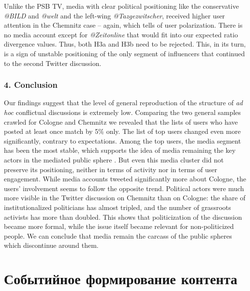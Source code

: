 Unlike the PSB TV, media with clear political positioning like the conservative \textit{@BILD} and \textit{@welt} and the left-wing \textit{@Tazgezwitscher}, received higher user attention in the Chemnitz case -- again, which tells of user polarization. There is no media account except for \textit{@Zeitonline} that would fit into our expected ratio divergence values. Thus, both H3a and H3b need to be rejected. This, in its turn, is a sign of unstable positioning of the only segment of influencers that continued to the second Twitter discussion.

\subsubsection{4. Conclusion}

Our findings suggest that the level of general reproduction of the structure of \textit{ad hoc} conflictual discussions is extremely low. Comparing the two general samples crawled for Cologne and Chemnitz we revealed that the lists of users who have posted at least once match by 5\% only. The list of top users changed even more significantly, contrary to expectations. Among the top users, the media segment has been the most stable, which supports the idea of media remaining the key actors in the mediated public sphere \cite{Calhoun}. But even this media cluster did not preserve its positioning, neither in terms of activity nor in terms of user engagement. While media accounts tweeted significantly more about Cologne, the users’ involvement seems to follow the opposite trend. Political actors were much more visible in the Twitter discussion on Chemnitz than on Cologne: the share of institutionalized politicians has almost tripled, and the number of grassroots activists has more than doubled. This shows that politicization of the discussion became more formal, while the issue itself became relevant for non-politicized people. We can conclude that media remain the carcass of the public spheres which discontinue around them.

\section{Событийное формирование контента}


